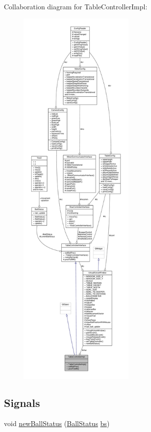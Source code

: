 Collaboration diagram for Table\+Controller\+Impl\+:\nopagebreak
\begin{figure}[H]
\begin{center}
\leavevmode
\includegraphics[height=550pt]{class_table_controller_impl__coll__graph}
\end{center}
\end{figure}
\subsection*{Signals}
\begin{DoxyCompactItemize}
\item 
void \hyperlink{class_table_controller_impl_abfd4337861229f9f1b50742e2df19677}{new\+Ball\+Status} (\hyperlink{class_ball_status}{Ball\+Status} \hyperlink{jquery_8js_ae77642f8ef73fb9c20c2a737d956acda}{bs})
\end{DoxyCompactItemize}
